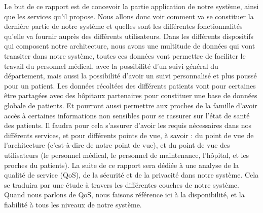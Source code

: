Le but de ce rapport est de concevoir la partie application de notre système, ainsi que les services qu’il propose. Nous allons
donc voir comment va se constituer la dernière partie de notre système et quelles sont les différentes fonctionnalités qu’elle va
fournir auprès des différents utilisateurs. Dans les différents dispositifs qui composent notre architecture, nous avons une
multitude de données qui vont transiter dans notre système, toutes ces données vont permettre de faciliter le travail du personnel
médical, avec la possibilité d’un suivi général du département, mais aussi la possibilité d’avoir un suivi personnalisé et plus
poussé pour un patient. Les données récoltées des différents patients vont pour certaines être partagées avec des hôpitaux
partenaires pour constituer une base de données globale de patients. Et pourront aussi permettre aux proches de la famille d’avoir
accès à certaines informations non sensibles pour se rassurer sur l'état de santé des patients. Il faudra pour cela s’assurer
d’avoir les requis nécessaires dans nos différents services, et pour différents points de vue, à savoir : du point de vue de
l’architecture (c’est-à-dire de notre point de vue), et du point de vue des utilisateurs (le personnel médical, le personnel de
maintenance, l’hôpital, et les proches du patients). La suite de ce rapport sera dédiée à une analyse de la qualité de service
(QoS), de la sécurité et de la privacité dans notre système. Cela se traduira par une étude à travers les différentes
couches de notre système. Quand nous parlons de QoS, nous faisons référence ici à la disponibilité, et la fiabilité à tous les
niveaux de notre système. 
